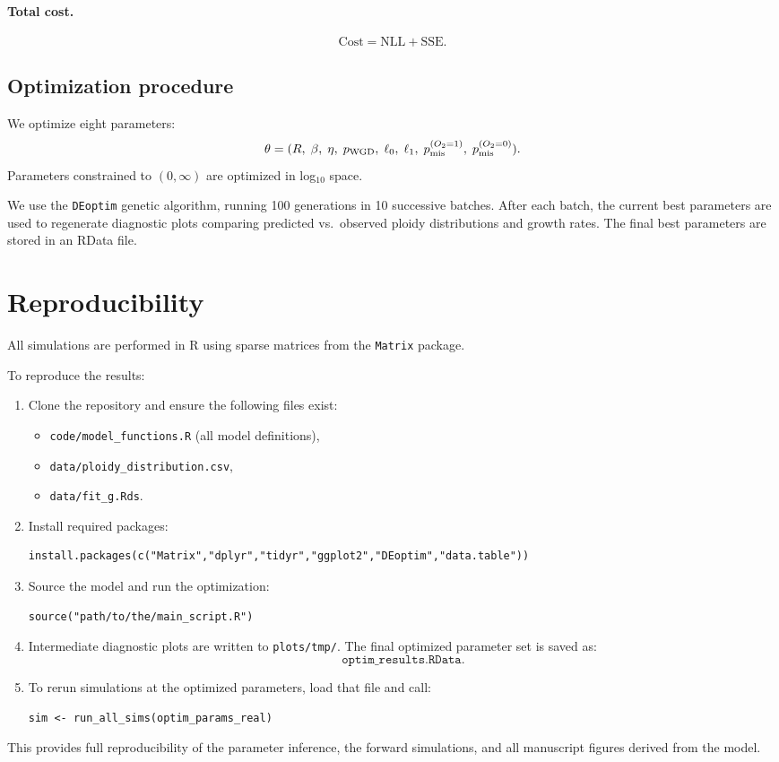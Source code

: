 \documentclass{article}
\begin{document}
\paragraph{Total cost.}
\[
\mathrm{Cost}
=
\mathrm{NLL}
+
\mathrm{SSE}.
\]

\subsection*{Optimization procedure}

We optimize eight parameters:
\[
\theta = 
(R,\;\beta,\;\eta,\;p_{\rm WGD},\;\ell_0,\;\ell_1,\;p_{\rm mis}^{(O_2=1)},\;p_{\rm mis}^{(O_2=0)}).
\]
Parameters constrained to $(0,\infty)$ are optimized in log\(_{10}\) space.

We use the \texttt{DEoptim} genetic algorithm, running
100 generations in 10 successive batches.
After each batch, the current best parameters are used to regenerate diagnostic
plots comparing predicted vs.\ observed ploidy distributions and growth rates.
The final best parameters are stored in an RData file.

\bigskip

\section*{Reproducibility}

All simulations are performed in R using sparse matrices from the
\texttt{Matrix} package.

To reproduce the results:

\begin{enumerate}
\item Clone the repository and ensure the following files exist:
  \begin{itemize}
  \item \texttt{code/model\_functions.R} (all model definitions),
  \item \texttt{data/ploidy\_distribution.csv},
  \item \texttt{data/fit\_g.Rds}.
  \end{itemize}

\item Install required packages:
\begin{verbatim}
install.packages(c("Matrix","dplyr","tidyr","ggplot2","DEoptim","data.table"))
\end{verbatim}

\item Source the model and run the optimization:
\begin{verbatim}
source("path/to/the/main_script.R")
\end{verbatim}

\item Intermediate diagnostic plots are written to 
\texttt{plots/tmp/}.
The final optimized parameter set is saved as:
\[
\texttt{optim\_results.RData}.
\]

\item To rerun simulations at the optimized parameters, load that file and call:
\begin{verbatim}
sim <- run_all_sims(optim_params_real)
\end{verbatim}
\end{enumerate}

This provides full reproducibility of the parameter inference, the forward
simulations, and all manuscript figures derived from the model.
\end{document}
